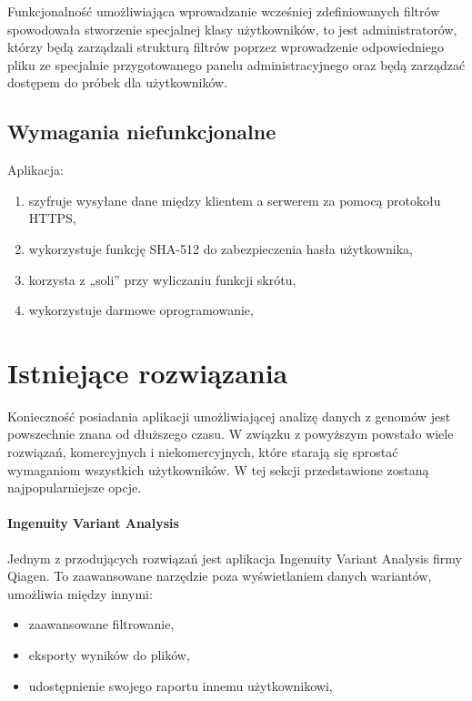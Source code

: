 \documentclass[a4paper,12pt,twoside]{article}
\begin{document}
Funkcjonalność umożliwiająca wprowadzanie wcześniej zdefiniowanych filtrów spowodowała stworzenie
specjalnej klasy użytkowników, to jest administratorów, którzy będą zarządzali strukturą filtrów poprzez wprowadzenie odpowiedniego pliku ze specjalnie przygotowanego panelu administracyjnego
oraz będą zarządzać dostępem do próbek dla użytkowników.

\subsection{Wymagania niefunkcjonalne}
Aplikacja:
\begin{enumerate}[1)]
\item szyfruje wysyłane dane między klientem a serwerem za pomocą protokołu HTTPS,
\item wykorzystuje funkcję SHA-512 \cite{sha} do zabezpieczenia hasła użytkownika,
\item korzysta z „soli” przy wyliczaniu funkcji skrótu,
\item wykorzystuje darmowe oprogramowanie,
\end{enumerate}

\newpage
\section{Istniejące rozwiązania}

Konieczność posiadania aplikacji umożliwiającej analizę danych z genomów
jest powszechnie znana od dłuższego czasu. W związku z powyższym
powstało wiele rozwiązań,
komercyjnych i niekomercyjnych, które starają się sprostać wymaganiom wszystkich użytkowników. W tej sekcji przedstawione zostaną najpopularniejsze opcje.

\paragraph{Ingenuity Variant Analysis} Jednym z przodujących rozwiązań jest aplikacja Ingenuity Variant Analysis \cite{ingenuity} firmy Qiagen. To zaawansowane narzędzie
poza wyświetlaniem danych wariantów, umożliwia między innymi:

\begin{itemize}
\item zaawansowane filtrowanie,
\item eksporty wyników do plików,
\item udostępnienie swojego raportu innemu użytkownikowi,
\end{itemize}
\end{document}
